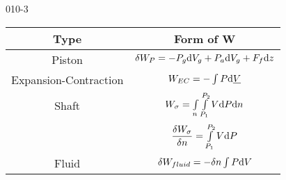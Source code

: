 \begin{mitframe}{010-3}


	\begin{longtable}{|c|c|}
	\hline
	Type & Form of W\\ \hline
    Piston & $\blthick\work_{\p}=-\p_{\grav}\mathrm{d}\vol_{\grav}+\p_{\activity}\mathrm{d}\vol_{\grav}+\force_{\fug}\mathrm{d}\heightz$ \\ \hline
    Expansion-Contraction & $\work_{EC}=-\int\p\mathrm{d}\uline{\vol}$ \\ \hline
   	Shaft & $\work_{\molecrad}=\int\limits_{n}\int\limits_{\p_{1}}^{\p_{2}}\vol\mathrm{d}\p\mathrm{d}n$ \\ 
& $\dfrac{\blthick\work_{\molecrad}}{\blthick n}=\int\limits_{\p_{1}}^{\p_{2}}\vol\mathrm{d}\p$ \\    \hline 
    Fluid & $\blthick\work_{fluid}=-\blthick n\int\p\mathrm{d}\vol$ \\ \hline
   
    \end{longtable}

\end{mitframe}